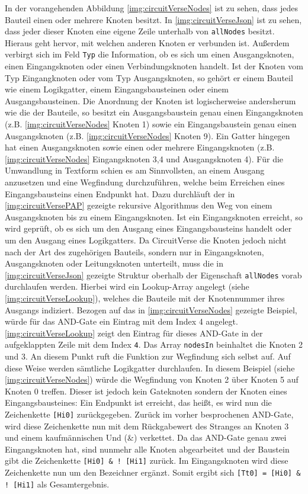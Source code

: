  
 In der vorangehenden Abbildung \ref{img:circuitVerseNodes} ist zu sehen, dass jedes Bauteil einen oder mehrere Knoten besitzt. In \autoref{img:circuitVerseJson} ist zu sehen, dass jeder dieser Knoten eine eigene Zeile unterhalb von \texttt{allNodes} besitzt. Hieraus geht hervor, mit welchen anderen Knoten er verbunden ist. Außerdem verbirgt sich im Feld \texttt{Typ} die Information, ob es sich um einen Ausgangsknoten, einen Eingangsknoten oder einen Verbindungsknoten handelt. Ist der Knoten vom Typ Eingangknoten oder vom Typ Ausgangsknoten, so gehört er einem Bauteil wie einem Logikgatter, einem Eingangsbausteinen oder einem Ausgangsbausteinen. Die Anordnung der Knoten ist logischerweise andersherum wie die der Bauteile, so besitzt ein Ausgangsbaustein genau einen Eingangsknoten (z.B. \ref{img:circuitVerseNodes} Knoten 1) sowie ein Eingangsbaustein genau einen Ausgangsknoten (z.B. \autoref{img:circuitVerseNodes} Knoten 9). Ein Gatter hingegen hat einen Ausgangsknoten sowie einen oder mehrere Eingangsknoten (z.B. \autoref{img:circuitVerseNodes} Eingangsknoten 3,4 und Ausgangsknoten 4). Für die Umwandlung in Textform schien es am Sinnvollsten, an einem Ausgang anzusetzen und eine Wegfindung durchzuführen, welche beim Erreichen eines Eingangsbausteins einen Endpunkt hat. Dazu durchläuft der in \autoref{img:circuitVersePAP} gezeigte rekursive Algorithmus den Weg von einem Ausgangsknoten bis zu einem Eingangsknoten. Ist ein Eingangsknoten erreicht, so wird geprüft, ob es sich um den Ausgang eines Eingangsbausteins handelt oder um den Ausgang eines Logikgatters. Da CircuitVerse die Knoten jedoch nicht nach der Art des zugehörigen Bauteils, sondern nur in Eingangsknoten, Ausgangsknoten oder Leitungsknoten unterteilt, muss die in \ref{img:circuitVerseJson} gezeigte Struktur oberhalb der Eigenschaft \texttt{allNodes} vorab durchlaufen werden. Hierbei wird ein Lookup-Array angelegt (siehe \autoref{img:circuitVerseLookup}), welches die Bauteile mit der Knotennummer ihres Ausgangs indiziert. Bezogen auf das in \autoref{img:circuitVerseNodes} gezeigte Beispiel, würde für das AND-Gate ein Eintrag mit dem Index 4 angelegt. \autoref{img:circuitVerseLookup} zeigt den Eintrag für dieses AND-Gate in der aufgeklappten Zeile mit dem Index \texttt{4}. Das Array \texttt{nodesIn} beinhaltet die Knoten 2 und 3. An diesem Punkt ruft die Funktion zur Wegfindung sich selbst auf. Auf diese Weise werden sämtliche Logikgatter durchlaufen. In diesem Beispiel (siehe \autoref{img:circuitVerseNodes}) würde die Wegfindung von Knoten 2 über Knoten 5 auf Knoten 0 treffen. Dieser ist jedoch kein Gateknoten sondern der Knoten eines Eingangsbausteines: Ein Endpunkt ist erreicht, das heißt, es wird nun die Zeichenkette \texttt{[Hi0]} zurückgegeben. Zurück im vorher besprochenen AND-Gate, wird diese Zeichenkette nun mit dem Rückgabewert des Stranges an Knoten 3 und einem kaufmännischen Und (\&) verkettet. Da das AND-Gate genau zwei Eingangsknoten hat, sind nunmehr alle Knoten abgearbeitet und der Baustein gibt die Zeichenkette \texttt{[Hi0] \& ! [Hi1]} zurück. Im Eingangsknoten wird diese Zeichenkette nun um den Bezeichner ergänzt.  Somit ergibt sich \texttt{[Tt0] = [Hi0] \& ! [Hi1]} als Gesamtergebnis. 
